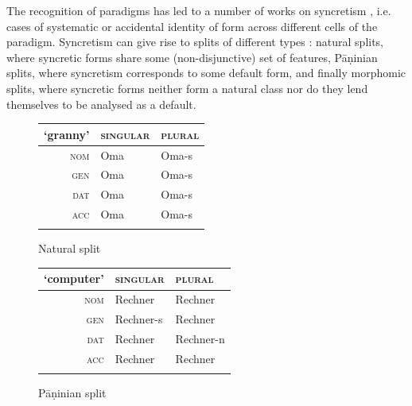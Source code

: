 \documentclass[output=paper
	        ,collection
	        ,collectionchapter
 	        ,biblatex
                ,babelshorthands
                ,newtxmath
                ,draftmode
                ,colorlinks, citecolor=brown
]{langscibook}
\begin{document}
The recognition of paradigms has led to a number of works on
syncretism \citep[see, e.g.][]{Baerman05}, i.e. cases of systematic or
accidental identity of form across different cells of the
paradigm. Syncretism can give rise to splits of different types
\citep{Corbett15}: natural splits, where syncretic forms share some
(non-disjunctive) set of features, Pāṇinian splits, where syncretism
corresponds to some default form, and finally morphomic splits, where
syncretic forms neither form a natural class nor do they lend
themselves to be analysed as a default. 

\begin{table}[htb]
  \centering
  
  \begin{subfigure}{.45\textwidth}
    
    \centering
    \begin{tabular}{r|ll}
      \lsptoprule
      `granny' & \textsc{singular} & \textsc{plural}\\
      \midrule
      \textsc{nom} & Oma & Oma-s\\
      \textsc{gen} & Oma & Oma-s\\
      \textsc{dat} & Oma & Oma-s\\
      \textsc{acc} & Oma & Oma-s\\
      \lspbottomrule
    \end{tabular}

    \caption{Natural split}
  \end{subfigure}  
  \begin{subfigure}{.50\textwidth}
    
    \centering
    \begin{tabular}{r|ll}
      \lsptoprule
      `computer' & \textsc{singular} & \textsc{plural}\\
      \midrule
      \textsc{nom} & Rechner & Rechner\\
      \textsc{gen} & Rechner-s & Rechner\\
      \textsc{dat} & Rechner & Rechner-n\\
      \textsc{acc} & Rechner & Rechner\\
      \lspbottomrule
    \end{tabular}
    \caption{Pāṇinian split}
  \end{subfigure}

  \begin{subfigure}{.45\textwidth}
    \centering


\end{subfigure}
\end{table}
\end{document}
